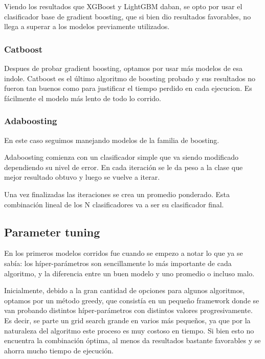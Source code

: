\documentclass[a4paper]{article}
\begin{document}
Viendo los resultados que XGBoost y LightGBM daban, se opto por usar el clasificador base de gradient boosting, que si bien dio resultados favorables, no llega a superar a los modelos previamente utilizados.

\subsubsection{Catboost}

Despues de probar gradient boosting, optamos por usar más modelos de esa indole. Catboost es el último algoritmo de boosting probado y sus resultados no fueron tan buenos como para justificar el tiempo perdido en cada ejecucion. Es fácilmente el modelo más lento de todo lo corrido.

\subsubsection{Adaboosting}

En este caso seguimos manejando modelos de la familia de boosting. 

Adaboosting comienza con un clasificador simple que va siendo modificado dependiendo su nivel de error. En cada iteración se le da peso a la clase que mejor resultado obtuvo y luego se vuelve a iterar. 

Una vez finalizadas las iteraciones se crea un promedio ponderado. Esta combinación lineal de los N clasificadores va a ser su clasificador final.

\subsection{Parameter tuning}

En los primeros modelos corridos fue cuando se empezo a notar lo que ya se sabía: los híper-parámetros son sencillamente lo más importante de cada algoritmo, y la diferencia entre un buen modelo y uno promedio o incluso malo.

Inicialmente, debido a la gran cantidad de opciones para algunos algoritmos, optamos por un método greedy, que consistía en un pequeño framework donde se van probando distintos híper-parámetros con distintos valores progresivamente. Es decir, se parte un grid search grande en varios más pequeños, ya que por la naturaleza del algoritmo este proceso es muy costoso en tiempo. Si bien esto no encuentra la combinación óptima, al menos da resultados bastante favorables y se ahorra mucho tiempo de ejecución.
\end{document}
